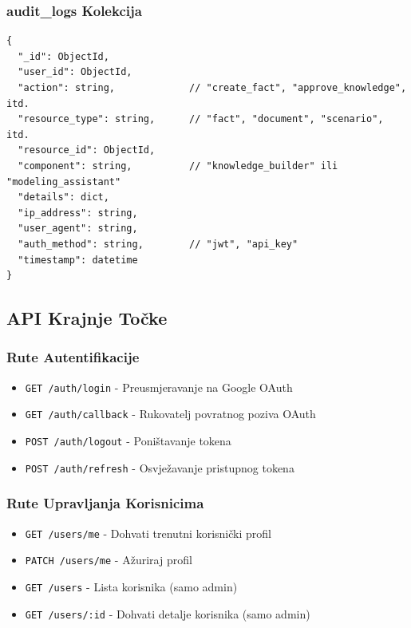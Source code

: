 \documentclass[12pt,a4paper]{article}
\begin{document}
\subsubsection{audit\_logs Kolekcija}
\begin{verbatim}
{
  "_id": ObjectId,
  "user_id": ObjectId,
  "action": string,             // "create_fact", "approve_knowledge", itd.
  "resource_type": string,      // "fact", "document", "scenario", itd.
  "resource_id": ObjectId,
  "component": string,          // "knowledge_builder" ili "modeling_assistant"
  "details": dict,
  "ip_address": string,
  "user_agent": string,
  "auth_method": string,        // "jwt", "api_key"
  "timestamp": datetime
}
\end{verbatim}

\subsection{API Krajnje Točke}

\subsubsection{Rute Autentifikacije}
\begin{itemize}
    \item \texttt{GET /auth/login} - Preusmjeravanje na Google OAuth
    \item \texttt{GET /auth/callback} - Rukovatelj povratnog poziva OAuth
    \item \texttt{POST /auth/logout} - Poništavanje tokena
    \item \texttt{POST /auth/refresh} - Osvježavanje pristupnog tokena
\end{itemize}

\subsubsection{Rute Upravljanja Korisnicima}
\begin{itemize}
    \item \texttt{GET /users/me} - Dohvati trenutni korisnički profil
    \item \texttt{PATCH /users/me} - Ažuriraj profil
    \item \texttt{GET /users} - Lista korisnika (samo admin)
    \item \texttt{GET /users/:id} - Dohvati detalje korisnika (samo admin)
\end{itemize}
\end{document}
